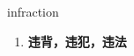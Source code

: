 
\begin{frame}
{\huge infraction}
\begin{center}
\begin{enumerate}\Large
  \item \textbf{违背，违犯，违法}
\end{enumerate}
\end{center}
\end{frame}
